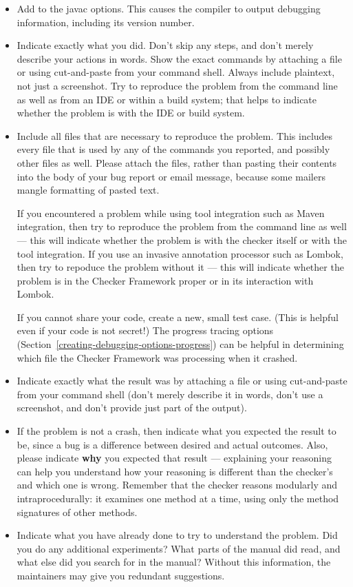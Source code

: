 \begin{itemize}
\item
  Add 
  to the javac options.  This causes the compiler to output
  debugging information, including its version number.
\item
  Indicate exactly what you did.  Don't skip any steps, and don't merely
  describe your actions in words.  Show the exact commands by attaching a
  file or using cut-and-paste from your command shell.  Always include
  plaintext, not just a screenshot.  Try to reproduce the problem from the
  command line as well as from an IDE or within a build system; that helps
  to indicate whether the problem is with the IDE or build system.
\item
  Include all files that are necessary to reproduce the problem.  This
  includes every file that is used by any of the commands you reported, and
  possibly other files as well.  Please attach the files, rather than
  pasting their contents into the body of your bug report or email message,
  because some mailers mangle formatting of pasted text.

  If you
  encountered a problem while using tool integration such as
  Maven integration, then try to reproduce the problem from the
  command line as well --- this will indicate whether the problem is with
  the checker itself or with the tool integration.  If you use an invasive
  annotation processor such as Lombok, then try to repoduce the problem
  without it --- this will indicate whether the problem is in the Checker
  Framework proper or in its interaction with Lombok.

  If you cannot share your code, create a new, small test case.  (This is
  helpful even if your code is not secret!)  The progress tracing options
  (Section~\ref{creating-debugging-options-progress}) can be helpful in
  determining which file the Checker Framework was processing when it
  crashed.
\item
  Indicate exactly what the result was by attaching a file or using
  cut-and-paste from your command shell (don't merely describe it in
  words, don't use a screenshot, and don't provide just part of the output).
\item
  If the problem is not a crash, then
  indicate what you expected the result to be, since a bug is a difference
  between desired and actual outcomes.  Also, please indicate \textbf{why}
  you expected that result --- explaining your reasoning can help you
  understand how your reasoning is different than the checker's and which
  one is wrong.  Remember that the checker reasons modularly and
  intraprocedurally:  it examines one method at a time, using only the
  method signatures of other methods.
\item
  Indicate what you have already done to try to understand the problem.
  Did you do any additional experiments?  What parts of the manual did
  read, and what else did you search for in the manual?  Without this
  information, the maintainers may give you redundant suggestions.
\end{itemize}

